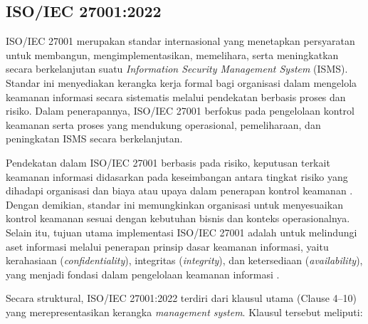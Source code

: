 \subsection{ISO/IEC 27001:2022}

ISO/IEC 27001 merupakan standar internasional yang menetapkan persyaratan untuk membangun, mengimplementasikan, memelihara, serta meningkatkan secara berkelanjutan suatu \textit{Information Security Management System} (ISMS). Standar ini menyediakan kerangka kerja formal bagi organisasi dalam mengelola keamanan informasi secara sistematis melalui pendekatan berbasis proses dan risiko. Dalam penerapannya, ISO/IEC 27001 berfokus pada pengelolaan kontrol keamanan serta proses yang mendukung operasional, pemeliharaan, dan peningkatan ISMS secara berkelanjutan.

Pendekatan dalam ISO/IEC 27001 berbasis pada risiko, keputusan terkait keamanan informasi didasarkan pada keseimbangan antara tingkat risiko yang dihadapi organisasi dan biaya atau upaya dalam penerapan kontrol keamanan \cite{gantz2014itaudit}. Dengan demikian, standar ini memungkinkan organisasi untuk menyesuaikan kontrol keamanan sesuai dengan kebutuhan bisnis dan konteks operasionalnya. Selain itu, tujuan utama implementasi ISO/IEC 27001 adalah untuk melindungi aset informasi melalui penerapan prinsip dasar keamanan informasi, yaitu kerahasiaan (\textit{confidentiality}), integritas (\textit{integrity}), dan ketersediaan (\textit{availability}), yang menjadi fondasi dalam pengelolaan keamanan informasi \cite{gantz2014itaudit,otero2019itcontrol}.

Secara struktural, ISO/IEC 27001:2022 terdiri dari klausul utama (Clause 4--10) yang merepresentasikan kerangka \textit{management system}. Klausul tersebut meliputi:

